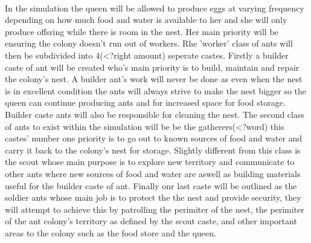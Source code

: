 \documentclass{report}
\begin{document}
\paragraph{}In the simulation the queen will be allowed to produce eggs at varying frequency depending on how much food and water is available to her and she will only produce offsring while there is room in the nest. Her main priority will be ensuring the colony doesn't run out of workers. Rhe 'worker' class of ants will then be subdivided into 4(<?right amount) seperate castes. Firstly a builder caste of ant will be created who's main priority is to build, maintain and repair the colony's nest. A builder ant's work will never be done as even when the nest is in excellent condition the ants will always strive to make the nest bigger so the queen can continue producing ants and for increased space for food storage. Builder caste ants will also be responsible for cleaning the nest. The second class of ants to exist within the simulation will be be the gatherers(<?word) this castes' number one priority is to go out to known sources of food and water and carry it back to the colony's nest for storage. Slightly different from this class is the scout whose main purpose is to explore new territory and communicate to other ants where new sources of food and water are aswell as building materials useful for the builder caste of ant. Finally onr last caste will be outlined as the soldier ants whose main job is to protect the the nest and provide security, they will attempt to achieve this by patrolling the perimiter of the nest, the perimiter of the ant colony's territory as defined by the scout caste, and other important areas to the colony such as the food store and the queen.
\end{document}
